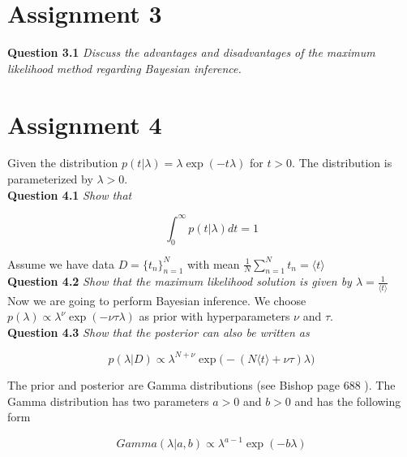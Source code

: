 \documentclass[a4paper]{article}
\begin{document}
\section*{Assignment 3}

\textbf{Question 3.1}  \textit{Discuss the advantages and disadvantages of the maximum likelihood method regarding Bayesian inference.}\\



\section*{Assignment 4}

Given the distribution $p(t | \lambda) = \lambda \exp(-t \lambda)$ for $t > 0$. The distribution is parameterized by $\lambda > 0$.\\

\textbf{Question 4.1}  \textit{Show that}

\begin{equation}
	\int_0^\infty p(t | \lambda) dt = 1
\end{equation}

Assume we have data $D = \{ t_n \}_{n=1}^N$ with mean $\frac{1}{N} \sum_{n=1}^N t_n = \langle t \rangle $\\

\textbf{Question 4.2}  \textit{Show that the maximum likelihood solution is given by $\lambda = \frac{1}{ \langle t \rangle}$}\\

Now we are going to perform Bayesian inference. We choose $p(\lambda) \propto \lambda^\nu \exp(- \nu \tau \lambda)$ as prior with hyperparameters $\nu$ and $\tau$.\\


\textbf{Question 4.3}  \textit{Show that the posterior can also be written as}

\begin{equation}
\label{eq:posterior}
	p(\lambda | D) \propto \lambda^{N + \nu} \exp \big( - (N \langle t \rangle + \nu \tau) \lambda \big)
\end{equation}


The prior and posterior are Gamma distributions (see Bishop page 688 ). The Gamma distribution has two parameters $a > 0$ and $b > 0$ and has the following form

\begin{equation}
\label{eq:gamma}
	Gamma(\lambda | a, b) \propto \lambda^{a-1} \exp(-b \lambda)
\end{equation}
\end{document}

